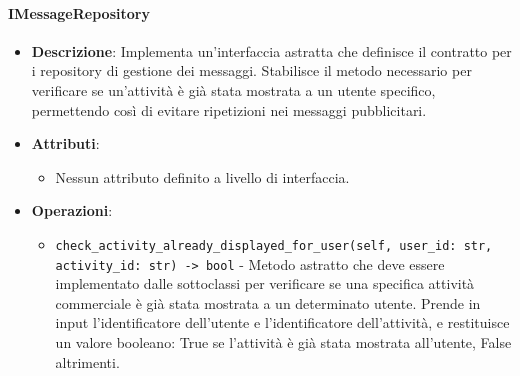 \documentclass[10pt]{article}
\begin{document}
    \paragraph{IMessageRepository}
    \begin{itemize} 
    \item \textbf{Descrizione}: Implementa un'interfaccia astratta che definisce il contratto per i repository di gestione dei messaggi. Stabilisce il metodo necessario per verificare se un'attività è già stata mostrata a un utente specifico, permettendo così di evitare ripetizioni nei messaggi pubblicitari.
    \item \textbf{Attributi}:
    \begin{itemize}
        \item Nessun attributo definito a livello di interfaccia.
    \end{itemize}
    
    \item \textbf{Operazioni}:
    \begin{itemize}
        \item \texttt{check\_activity\_already\_displayed\_for\_user(self, user\_id: str, activity\_id: str) -> bool} - Metodo astratto che deve essere implementato dalle sottoclassi per verificare se una specifica attività commerciale è già stata mostrata a un determinato utente. Prende in input l'identificatore dell'utente e l'identificatore dell'attività, e restituisce un valore booleano: True se l'attività è già stata mostrata all'utente, False altrimenti.
    \end{itemize}
    \end{itemize}
\end{document}
